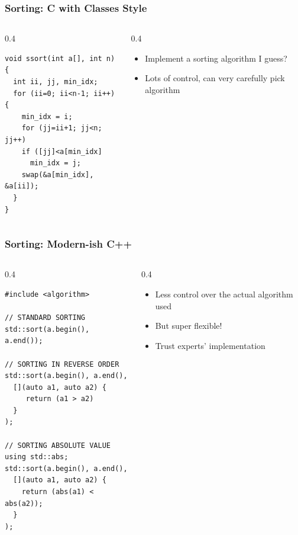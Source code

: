 \documentclass{beamer} \usetheme{Madrid}
\begin{document}
\begin{frame}[fragile]
	\frametitle{Sorting: C with Classes Style}
	\begin{columns}
		\begin{column}{{0.4\textwidth}}
			\begin{verbatim}
void ssort(int a[], int n) {
  int ii, jj, min_idx;
  for (ii=0; ii<n-1; ii++) {
    min_idx = i;
	for (jj=ii+1; jj<n; jj++)
	if ([jj]<a[min_idx]
	  min_idx = j;
	swap(&a[min_idx], &a[ii]);
  }
}
			\end{verbatim}
		\end{column}
		\begin{column}{{0.4\textwidth}}
			\begin{itemize}
				\item Implement a sorting algorithm I guess?
				\item Lots of control, can very carefully pick algorithm
			\end{itemize}
		\end{column}
	\end{columns}
\end{frame}

\begin{frame}[fragile]
	\frametitle{Sorting: Modern-ish C++}
	\begin{columns}
		\begin{column}{{0.4\textwidth}}
			\begin{verbatim}
#include <algorithm>

// STANDARD SORTING
std::sort(a.begin(), a.end());

// SORTING IN REVERSE ORDER
std::sort(a.begin(), a.end(),
  [](auto a1, auto a2) {
     return (a1 > a2)
  }
);

// SORTING ABSOLUTE VALUE
using std::abs;
std::sort(a.begin(), a.end(),
  [](auto a1, auto a2) {
    return (abs(a1) < abs(a2));
  }
);
			\end{verbatim}
		\end{column}
		\begin{column}{{0.4\textwidth}}
			\begin{itemize}
				\item Less control over the actual algorithm used
				\item But super flexible!
				\item Trust experts' implementation
			\end{itemize}
		\end{column}
	\end{columns}
\end{frame}
\end{document}
